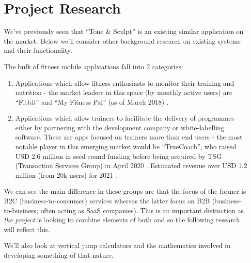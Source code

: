 \chapter{Project Research}
\label{chap:research}
We've previously seen that ``Tone \& Sculpt'' is an existing similar application
on the market. Below we'll consider other background research on existing
systems and their functionality.

The bulk of fitness mobile applications fall into 2 categories:
\begin{enumerate}
	\item Applications which allow fitness enthusiasts to monitor their training
	      and nutrition - the market leaders in this space
	      (by monthly active users) are ``Fitbit''
	      and ``My Fitness Pal'' (as of March 2018) \cite{statista-monthly-users}.
	\item Applications which allow trainers to facilitate the delivery of programmes
	      either by partnering with the development company or white-labelling software.
	      These are apps focused on trainers more than end users - the most notable player
	      in this emerging market would be ``TrueCoach''\href{https://truecoach.co/} , who
	      raised USD 2.6 million in seed round funding before being
	      acquired by TSG (Transaction Services Group) in April 2020 \cite{truecoach-funding}.
	      Estimated revenue over USD 1.2 million (from 20k users) for 2021 \cite{truecoach-revenue}.
\end{enumerate}

We can see the main difference in these groups are that
the focus of the former is B2C (business-to-consumer) services
whereas the latter focus on B2B (business-to-business; often acting as SaaS companies).
This is an important distinction as \textit{the project} is looking to combine elements
of both and so the following research will reflect this.
\par
We'll also look at vertical jump calculators and the mathematics involved in developing
something of that nature.
\pagebreak

